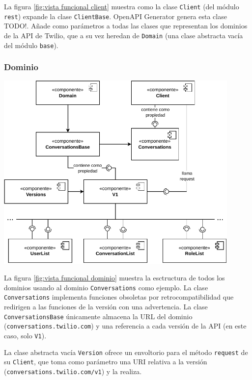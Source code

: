 \documentclass{article}
\begin{document}
\hfill

La figura \ref{fig:vista funcional client}
muestra como la clase \verb|Client|
(del módulo \verb|rest|)
expande la clase \verb|ClientBase|.
OpenAPI Generator genera esta clase
\cite{twilio-generated-openapi} TODO!.
Añade como parámetros a todas las clases
que representan los dominios de la API de Twilio,
que a su vez heredan de \verb|Domain|
(una clase abstracta vacía del módulo \verb|base|).


\subsubsection{Dominio}

\hfill

\begin{center}
  \includegraphics[width=0.9\textwidth]{VistaFuncionalDominio.pdf}
  \label{fig:vista funcional dominio}
\end{center}

\hfill

La figura \ref{fig:vista funcional dominio}
muestra la esctructura de todos los dominios
usando al dominio \verb|Conversations| como ejemplo.
La clase \verb|Conversations| implementa funciones obsoletas por retrocompatibilidad
que redirigen a las funciones de la versión con una advertencia.
La clase \verb|ConversationsBase| únicamente almacena la URL del dominio
(\verb|conversations.twilio.com|)
y una referencia a cada versión de la API
(en este caso, solo \verb|V1|).

La clase abstracta vacía \verb|Version|
ofrece un envoltorio para el método \verb|request| de su \verb|Client|,
que toma como parámetro una URI relativa a la versión
(\verb|conversations.twilio.com/v1|)
y la realiza.
\end{document}
